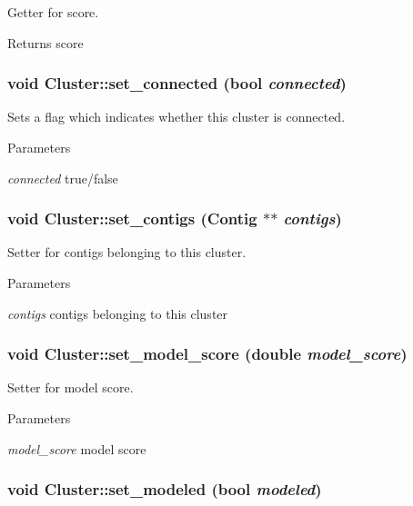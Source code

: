 Getter for score. \begin{DoxyReturn}{Returns}
score 
\end{DoxyReturn}
\hypertarget{classCluster_ace2b06c9963967d0690d57e560387c86}{
\subsubsection[{set\_\-connected}]{\setlength{\rightskip}{0pt plus 5cm}void Cluster::set\_\-connected (bool {\em connected})}}
\label{classCluster_ace2b06c9963967d0690d57e560387c86}


Sets a flag which indicates whether this cluster is connected. 
\begin{DoxyParams}{Parameters}
\item[{\em connected}]true/false \end{DoxyParams}
\hypertarget{classCluster_a29e877f84a6205092ce20662082b9ff6}{
\subsubsection[{set\_\-contigs}]{\setlength{\rightskip}{0pt plus 5cm}void Cluster::set\_\-contigs ({\bf Contig} $\ast$$\ast$ {\em contigs})}}
\label{classCluster_a29e877f84a6205092ce20662082b9ff6}


Setter for contigs belonging to this cluster. 
\begin{DoxyParams}{Parameters}
\item[{\em contigs}]contigs belonging to this cluster \end{DoxyParams}
\hypertarget{classCluster_aa096f32a30afcfa085e381a0118d51a1}{
\subsubsection[{set\_\-model\_\-score}]{\setlength{\rightskip}{0pt plus 5cm}void Cluster::set\_\-model\_\-score (double {\em model\_\-score})}}
\label{classCluster_aa096f32a30afcfa085e381a0118d51a1}


Setter for model score. 
\begin{DoxyParams}{Parameters}
\item[{\em model\_\-score}]model score \end{DoxyParams}
\hypertarget{classCluster_a0eb75fa38d420f14af89d1f0b4bb5513}{
\subsubsection[{set\_\-modeled}]{\setlength{\rightskip}{0pt plus 5cm}void Cluster::set\_\-modeled (bool {\em modeled})}}
\label{classCluster_a0eb75fa38d420f14af89d1f0b4bb5513}



